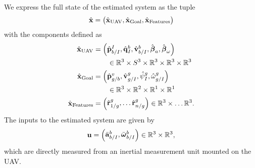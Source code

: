 We express the full state of the estimated system as the tuple
\begin{equation}
  \hat{\boldsymbol{\mathrm{x}}} =
  \begin{pmatrix}
    \hat{\boldsymbol{\mathrm{x}}}_{\text{UAV}}, \hat{\boldsymbol{\mathrm{x}}}_{\text{Goal}}, \hat{\boldsymbol{\mathrm{x}}}_{\text{Features}}
  \end{pmatrix}
\end{equation}
with the components defined as
\begin{align}
  \hat{\boldsymbol{\mathrm{x}}}_{\text{UAV}} &=
  \begin{pmatrix}
    \hat{\boldsymbol{\mathrm{p}}}_{b/I}^{I}, \hat{\boldsymbol{\mathrm{q}}}_I^{b}, \hat{\boldsymbol{\mathrm{v}}}_{b/I}^b,
    \hat{\boldsymbol{\mathrm{\beta}}}_a,
    \hat{\boldsymbol{\mathrm{\beta}}}_{\omega}
  \end{pmatrix} \\
                              & \qquad 
    \in \mathbb{R}^3 \times S^3 \times \mathbb{R}^3 \times \mathbb{R}^3 \times
    \mathbb{R}^3  \nonumber \\
    \hat{\boldsymbol{\mathrm{x}}}_{\text{Goal}} & =
    \begin{pmatrix}
      \hat{\boldsymbol{\mathrm{p}}}_{g/b}^{v}, \hat{\boldsymbol{\mathrm{v}}}_{g/I}^{g}, \hat{\psi}_{I}^{g},
      \hat{\omega}_{g/I}^{g}
    \end{pmatrix} \\
                           & \qquad
    \in \mathbb{R}^3 \times \mathbb{R}^2 \times \mathbb{R}^1 \times \mathbb{R}^1
    \nonumber \\
    \hat{\boldsymbol{\mathrm{x}}}_{\text{Features}} & =
    \begin{pmatrix}
      \hat{\boldsymbol{\mathrm{r}}}_{1/g}^{g}, \dots \hat{\boldsymbol{\mathrm{r}}}_{n/g}^{g}
    \end{pmatrix}
    \in \mathbb{R}^3 \times \dots \mathbb{R}^3.
\end{align}
The inputs to the estimated system are given by
\begin{equation}
  \boldsymbol{\mathrm{u}} = \begin{pmatrix} \bar{\boldsymbol{\mathrm{a}}}_{b/I}^b, \bar{\boldsymbol{\mathrm{\omega}}}_{b/I}^b \end{pmatrix} \in
        \mathbb{R}^3 \times \mathbb{R}^3,
\end{equation}
which are directly measured from an inertial measurement unit mounted on the UAV.

